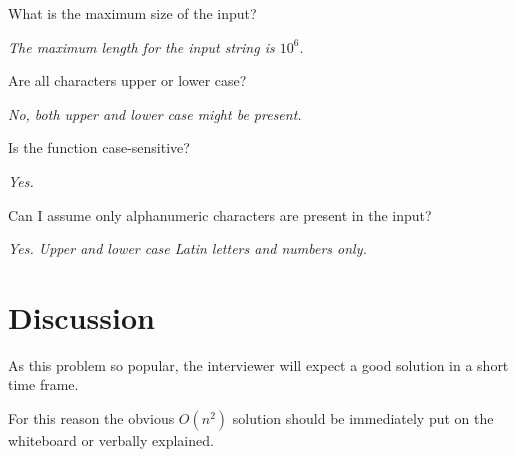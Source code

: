 \begin{QandA}
	\item \begin{questionitem} \begin{question} What is the maximum size of the input?  \end{question} 	 
    \begin{answered}
		\textit{The maximum length for the input string is $10^6$.}
	\end{answered} \end{questionitem}
	
	\item \begin{questionitem} \begin{question} Are all characters upper or lower case?  \end{question} 	 
    \begin{answered}
		\textit{No, both upper and lower case might be present.}
	\end{answered} \end{questionitem}

	\item \begin{questionitem} \begin{question} Is the function case-sensitive?  \end{question} 	 
    \begin{answered}
		\textit{Yes.}
	\end{answered} \end{questionitem}

	\item \begin{questionitem} \begin{question} Can I assume only alphanumeric characters are present in the input?  \end{question} 	 
    \begin{answered}
		\textit{Yes. Upper and lower case Latin letters and numbers only.}
	\end{answered} \end{questionitem}
\end{QandA}

\section{Discussion}
As this problem so popular, the interviewer will expect a good solution in a short time frame. 

For this reason the obvious $O(n^2)$ solution should be
immediately put on the whiteboard or verbally explained.


